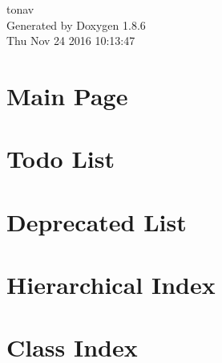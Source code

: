 \documentclass[twoside]{book}
\newcommand{\clearemptydoublepage}{%
  \newpage{\pagestyle{empty}\cleardoublepage}%
}
\begin{document}
\hypersetup{pageanchor=false}
\begin{titlepage}
\vspace*{7cm}
\begin{center}%
{\Large tonav }\\
\vspace*{1cm}
{\large Generated by Doxygen 1.8.6}\\
\vspace*{0.5cm}
{\small Thu Nov 24 2016 10:13:47}\\
\end{center}
\end{titlepage}
\clearemptydoublepage
\tableofcontents
\clearemptydoublepage
{}
\hypersetup{pageanchor=true}

\chapter{Main Page}
\label{index}\hypertarget{index}{}
\chapter{Todo List}
\label{todo}
\hypertarget{todo}{}

\chapter{Deprecated List}
\label{deprecated}
\hypertarget{deprecated}{}

\chapter{Hierarchical Index}

\chapter{Class Index}

\end{document}
